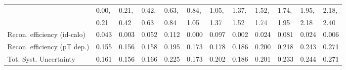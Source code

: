 \begin{tabular}{l|p{0.6cm}p{0.6cm}p{0.6cm}p{0.6cm}p{0.6cm}p{0.6cm}p{0.6cm}p{0.6cm}p{0.6cm}p{0.6cm}p{0.6cm}}
\hline
   & 0.00, & 0.21, & 0.42, & 0.63, & 0.84, & 1.05, & 1.37, & 1.52, & 1.74, & 1.95, & 2.18,  \\ 
   & 0.21 & 0.42 & 0.63 & 0.84 & 1.05 & 1.37 & 1.52 & 1.74 & 1.95 & 2.18 & 2.40  \\ 
\hline
Recon. efficiency (id-calo)              & 0.043 & 0.003 & 0.052 & 0.112 & 0.000 & 0.097 & 0.002 & 0.024 & 0.081 & 0.024 & 0.006 \\
\hline
Recon. efficiency (pT dep.)              & 0.155 & 0.156 & 0.158 & 0.195 & 0.173 & 0.178 & 0.186 & 0.200 & 0.218 & 0.243 & 0.271 \\
\hline
Tot. Syst. Uncertainty                   & 0.161 & 0.156 & 0.166 & 0.225 & 0.173 & 0.202 & 0.186 & 0.201 & 0.233 & 0.244 & 0.271 \\
\hline
\end{tabular}
